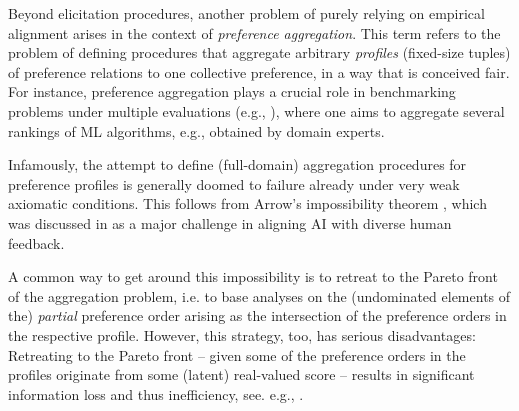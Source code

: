 \documentclass{article}
\theoremstyle{plain}
\theoremstyle{definition}
\theoremstyle{remark}
\begin{document}
Beyond elicitation procedures, another problem of purely relying on empirical alignment arises in the context of \textit{preference aggregation}. This term refers to the problem of defining procedures that aggregate arbitrary \textit{profiles} (fixed-size tuples) of preference relations to one collective preference, in a way that is conceived fair. For instance, preference aggregation plays a crucial role in benchmarking problems under multiple evaluations (e.g., \citet{ehl2012,mptbw2015,iclr-2024,pmlr-v235-zhang24u}), where one aims to aggregate several rankings of ML algorithms, e.g., obtained by domain experts.

Infamously, the attempt to define (full-domain) aggregation procedures for preference profiles is generally doomed to failure already under very weak axiomatic conditions. This follows from Arrow's impossibility theorem \citep{arrow1950}, which was %
discussed in \citet{conitzerposition} as a major challenge in aligning AI with diverse human feedback. 

A common way to get around this impossibility is to retreat to the Pareto front of the aggregation problem, i.e. to base analyses on the (undominated elements of the) \textit{partial} preference order arising as the intersection of the preference orders in the respective profile. %
However, this strategy, too, has serious disadvantages: Retreating to the Pareto front -- given some of the preference orders in the profiles originate from some (latent) real-valued score -- results in significant information loss and thus inefficiency, see. e.g., \citet{mdai, farrow2009almost}. %
\end{document}
